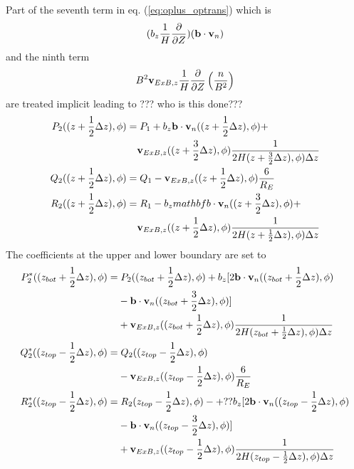 %
Part of the seventh term in eq. (\ref{eq:oplus_optrans}) which is
%
\begin{align}
  (b_z \frac{1}{H}\frac{\partial}{\partial Z})(\mathbf{b}\cdot
  \mathbf{v}_n) \notag
\end{align}
%
and the ninth term
%
\begin{align}
  B^2 \mathbf{v}_{ExB,z} \frac{1}{H}
  \frac{\partial}{\partial Z}
  \left( \frac{n}{B^2}\right) \notag
\end{align}
%
are treated implicit leading to ??? who is this done???
%
\begin{align}
  P_2((z+\frac{1}{2}\Delta z),\phi) = & \;  P_1 + b_z \mathbf{b} \cdot
          \mathbf{v}_n((z+\frac{1}{2}\Delta z),\phi) + \notag \\
       {} & \mathbf{v}_{ExB,z}((z+\frac{3}{2}\Delta z),\phi) \frac{1}{2H(z+\frac{3}{2}\Delta z),\phi)\Delta z} \\
  Q_2((z+\frac{1}{2}\Delta z),\phi) = & \; Q_1 - \mathbf{v}_{ExB,z}((z+\frac{1}{2}\Delta z),\phi)
   \frac{6}{R_E} \\
  R_2((z+\frac{1}{2}\Delta z),\phi) = & \; R_1 -
       b_z mathbf{b} \cdot \mathbf{v}_n((z+\frac{3}{2}\Delta z),\phi) + \notag \\
       {} & \mathbf{v}_{ExB,z}((z+\frac{1}{2}\Delta z),\phi) \frac{1}{2H(z+\frac{1}{2}\Delta z),\phi)\Delta z}
\end{align}
%
The coefficients at the upper and lower boundary are set to
%
\begin{align}
  P_2^*((z_{bot}+\frac{1}{2}\Delta z),\phi) = & \;  P_2((z_{bot}+\frac{1}{2}\Delta z),\phi) +
    b_z
    [ 2 \mathbf{b} \cdot \mathbf{v}_n((z_{bot}+\frac{1}{2}\Delta
    z),\phi) \notag \\
    {} &- \mathbf{b} \cdot \mathbf{v}_n((z_{bot}+\frac{3}{2}\Delta z),\phi)
    ]  \\
     {} &  +
       \mathbf{v}_{ExB,z}((z_{bot}+\frac{1}{2}\Delta z),\phi)
       \frac{1}{2H(z_{bot}+\frac{1}{2}\Delta z),\phi)\Delta z} \notag \\
%
  Q_2^*((z_{top}-\frac{1}{2}\Delta z),\phi) = & \; Q_2((z_{top}-\frac{1}{2}\Delta z),\phi)
  \notag \\
  {} & -
    \mathbf{v}_{ExB,z}((z_{top}-\frac{1}{2}\Delta z),\phi)
   \frac{6}{R_E} \\
%
  R_2^*((z_{top}-\frac{1}{2}\Delta z),\phi) = & \; R_2(z_{top}-\frac{1}{2}\Delta z),\phi)
  -+??
    b_z [ 2 \mathbf{b} \cdot \mathbf{v}_n((z_{top}-\frac{1}{2}\Delta
    z),\phi) \notag \\
    {}&-
    \mathbf{b} \cdot \mathbf{v}_n((z_{top}-\frac{3}{2}\Delta z),\phi)
    ] \\
     {} &  +
       \mathbf{v}_{ExB,z}((z_{top}-\frac{1}{2}\Delta z),\phi)
       \frac{1}{2H(z_{top}-\frac{1}{2}\Delta z),\phi)\Delta z}
       \notag
\end{align}
